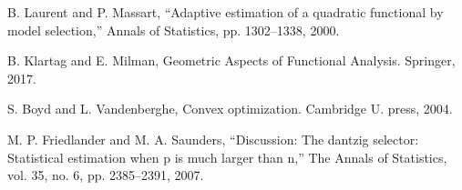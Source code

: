 \documentclass[journal]{IEEEtran}
\begin{document}
\begin{thebibliography}{30}
B. Laurent and P. Massart, “Adaptive estimation of a quadratic functional by model selection,” Annals of Statistics, pp. 1302–1338, 2000.

B. Klartag and E. Milman, Geometric Aspects of Functional Analysis. Springer, 2017.

S. Boyd and L. Vandenberghe, Convex optimization. Cambridge U. press, 2004.

M. P. Friedlander and M. A. Saunders, “Discussion: The dantzig selector: Statistical estimation when p is much larger than n,” The Annals of Statistics, vol. 35, no. 6, pp. 2385–2391, 2007.

\end{thebibliography}
\end{document}
